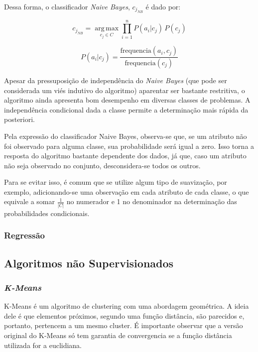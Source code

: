 \documentclass{article}
\begin{document}
Dessa forma, o classificador {\it Naive Bayes}, $c_{j_{NB}}$ é dado por:

\begin{equation}
c_{j_{NB}} = \operatorname*{arg\,max}_{c_j \in C} \prod_{i=1}^n P(a_i|c_j) \, P(c_j)
\end{equation}

\begin{equation}
P(a_i|c_j) = \frac{\mathrm{frequencia}(a_i,c_j)}{\mathrm{frequencia}(c_j)}
\end{equation}

Apesar da pressuposição de independência do {\it Naive Bayes}
(que pode ser considerada um viés indutivo do algoritmo) aparentar ser bastante restritiva,
o algoritmo ainda apresenta bom desempenho em diversas classes de problemas.
A independência condicional dada a classe permite a determinação mais rápida da posteriori.

Pela expressão do classificador Naive Bayes, observa-se que,
se um atributo não foi observado para alguma classe, sua probabilidade será igual a zero.
Isso torna a resposta do algoritmo bastante dependente dos dados,
já que, caso um atributo não seja observado no conjunto, desconsidera-se todos os outros.

Para se evitar isso, é comum que se utilize algum tipo de suavização, por exemplo,
adicionando-se uma observação em cada atributo de cada classe,
o que equivale a somar $\frac{1}{|C|}$ no numerador e 1 no denominador na determinação das probabilidades condicionais.

\subsubsection{Regressão}

\subsection{Algoritmos não Supervisionados}

\subsubsection{{\b \it K-Means}}
K-Means é um algoritmo de clustering com uma abordagem geométrica.
A ideia dele é que elementos próximos, segundo uma função distância, são parecidos e, portanto, pertencem a um mesmo cluster.
É importante observar que a versão original do K-Means só tem garantia de convergencia se a função distância utilizada for a euclidiana.
\end{document}
